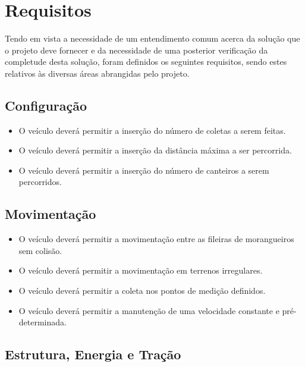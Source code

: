 \chapter{Requisitos}

  Tendo em vista a necessidade de um entendimento comum acerca da solução que o projeto deve fornecer e da necessidade de uma
  posterior verificação da completude desta solução, foram definidos os seguintes requisitos, sendo estes relativos às diversas
  áreas abrangidas pelo projeto.

  \section{Configuração}

    \begin{itemize}
      \item O veículo deverá permitir a inserção do número de coletas a serem feitas.
      \item O veículo deverá permitir a inserção da distância máxima a ser percorrida.
      \item O veículo deverá permitir a inserção do número de canteiros a serem percorridos.
    \end{itemize}

  \section{Movimentação}

    \begin{itemize}
      \item O veículo deverá permitir a movimentação entre as fileiras de morangueiros sem colisão.
      \item O veículo deverá permitir a movimentação em terrenos irregulares.
      \item O veículo deverá permitir a coleta nos pontos de medição definidos.
      \item O veículo deverá permitir a manutenção de uma velocidade constante e pré-determinada.
    \end{itemize}

  \section{Estrutura, Energia e Tração}


